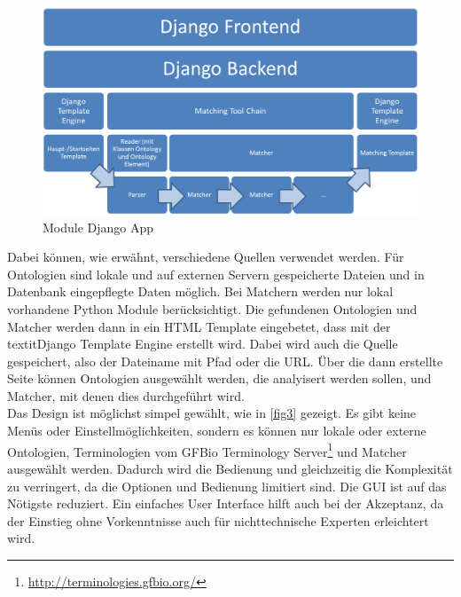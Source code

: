 		\begin{figure}[h!]
		\centering
		\includegraphics[width=1.0\textwidth]{pics/Module-overview1.png}
		\caption{Module Django App}
		\label{fig2}
		\end{figure}
		Dabei können, wie erwähnt, verschiedene Quellen verwendet werden. Für
		Ontologien sind lokale und auf externen Servern gespeicherte Dateien und in Datenbank
		eingepflegte Daten möglich. Bei Matchern werden nur lokal vorhandene Python
		Module berücksichtigt. Die gefundenen Ontologien und Matcher werden dann in
		ein HTML Template eingebetet, dass mit der textit{Django Template Engine} erstellt wird. Dabei wird auch die Quelle gespeichert, also der Dateiname mit Pfad oder
		die URL.
		\pagebreak[4]
		Über die dann erstellte Seite können Ontologien ausgewählt werden, die
		analyisert werden sollen, und Matcher, mit denen dies durchgeführt wird.\\
		Das Design ist möglichst simpel gewählt, wie in \ref{fig3} gezeigt. Es gibt
		keine Menüs oder Einstellmöglichkeiten, sondern es können nur
		lokale oder externe Ontologien, Terminologien vom GFBio Terminology
		Server\footnote{\url{http://terminologies.gfbio.org/}} und Matcher ausgewählt
		werden.
		Dadurch wird die Bedienung und gleichzeitig die Komplexität zu verringert, da die
		Optionen und Bedienung limitiert sind. Die GUI ist auf das Nötigste
		reduziert. Ein einfaches User Interface hilft auch bei
		der Akzeptanz, da der Einstieg ohne Vorkenntnisse auch für nichttechnische
		Experten erleichtert wird.
